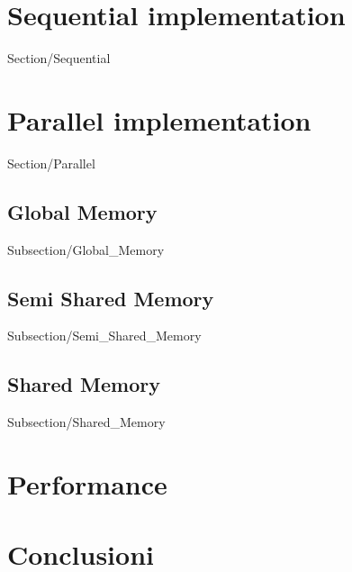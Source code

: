 \documentclass[12pt,a4paper,titlepage]{article}
\begin{document}
\newpage
\section{Sequential implementation}
 {Section/Sequential}

\newpage
\section{Parallel implementation}
 {Section/Parallel}

\subsection{Global Memory}
 {Subsection/Global_Memory}

\subsection{Semi Shared Memory}
 {Subsection/Semi_Shared_Memory}	

\subsection{Shared Memory}
 {Subsection/Shared_Memory}

\newpage
\section{Performance}


\newpage
\section{Conclusioni}


\newpage

\nocite{*}
\printbibliography
\end{document}
